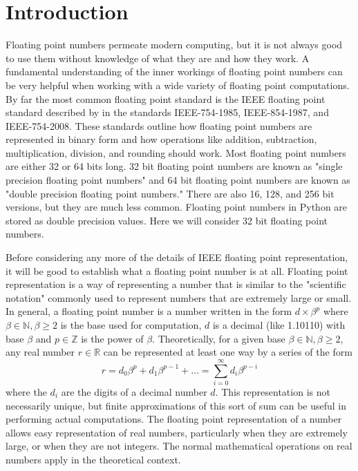 \label{lab:IEEE}

\section*{Introduction}

Floating point numbers permeate modern computing, but it is not always good to use them without knowledge of what they are and how they work.
A fundamental understanding of the inner workings of floating point numbers can be very helpful when working with a wide variety of floating point computations.
By far the most common floating point standard is the IEEE floating point standard described by in the standards IEEE-754-1985, IEEE-854-1987, and IEEE-754-2008.
These standards outline how floating point numbers are represented in binary form and how operations like addition, subtraction, multiplication, division, and rounding should work.
Most floating point numbers are either 32 or 64 bits long.
32 bit floating point numbers are known as "single precision floating point numbers" and 64 bit floating point numbers are known as "double precision floating point numbers."
There are also 16, 128, and 256 bit versions, but they are much less common.
Floating point numbers in Python are stored as double precision values.
Here we will consider 32 bit floating point numbers.

Before considering any more of the details of IEEE floating point representation, it will be good to establish what a floating point number is at all.
Floating point representation is a way of representing a number that is similar to the "scientific notation" commonly used to represent numbers that are extremely large or small.
In general, a floating point number is a number written in the form $d \times \beta^p$ where $\beta \in \mathbb{N}, \beta \geq 2$ is the base used for computation, $d$ is a decimal (like 1.10110) with base $\beta$ and $p\in \mathbb{Z}$ is the power of $\beta$.
Theoretically, for a given base $\beta \in \mathbb{N}, \beta \geq 2$, any real number $r \in \mathbb{R}$ can be represented at least one way by a series of the form
\begin{equation*}
r = d_0 \beta^{p} + d_1 \beta^{p-1} + \dots = \sum_{i=0}^{\infty} d_i \beta^{p-i}
\end{equation*}
where the $d_i$ are the digits of a decimal number $d$.
This representation is not necessarily unique, but finite approximations of this sort of sum can be useful in performing actual computations.
The floating point representation of a number allows easy representation of real numbers, particularly when they are extremely large, or when they are not integers.
The normal mathematical operations on real numbers apply in the theoretical context.

